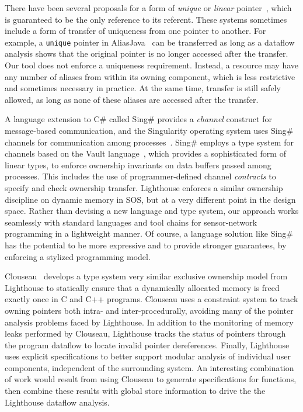 There have been several proposals for a form of {\em unique} or {\em linear}
pointer~\cite{Boyland:2001:ABU,aliasjava,Wad90:linear}, which is guaranteed
to be the only reference to its referent.  
%
These systems sometimes include a form of transfer of uniqueness from one
pointer to another.
%
For example, a {\tt unique} pointer in AliasJava~\cite{aliasjava} can be
transferred as long as a dataflow analysis shows that the original pointer
is no longer accessed after the transfer.  
%
Our tool does not enforce a uniqueness requirement.
%
Instead, a resource may have any number of aliases from within its owning
component, which is less restrictive and sometimes necessary in practice.
%
%  
At the same time, transfer is still safely allowed, as long as none of these
aliases are accessed after the transfer.



A language extension to C\# called Sing\# provides a {\em channel} construct
for message-based communication, and the Singularity operating system uses
Sing\# channels for communication among
processes~\cite{fahndrich06language}.  
%
Sing\# employs a type system for channels based on the Vault
language~\cite{Vault,adoption-focus}, which provides a sophisticated form of
linear types, to enforce ownership invariants on data buffers passed among
processes.  
%
This includes the use of programmer-defined channel {\em contracts} to
specify and check ownership transfer.
%
Lighthouse enforces a similar ownership discipline on dynamic memory in SOS,
but at a very different point in the design space.  
%
Rather than devising a new language and type system, our approach works
seamlessly with standard languages and tool chains for sensor-network
programming in a lightweight manner.  
%
Of course, a language solution like Sing\# has the potential to be more
expressive and to provide stronger guarantees, by enforcing a stylized
programming model.



%
Clouseau~\cite{heine03pldi} develops a type system very similar exclusive
ownership model from Lighthouse to statically ensure that a dynamically
allocated memory is freed exactly once in C and C++ programs.
%
Clouseau uses a constraint system to track owning pointers both intra- and
inter-procedurally, avoiding many of the pointer analysis problems faced by
Lighthouse.
%
In addition to the monitoring of memory leaks performed by Clouseau,
Lighthouse tracks the status of pointers through the program dataflow to
locate invalid pointer dereferences.
%
Finally, Lighthouse uses explicit specifications to better support modular
analysis of individual user components, independent of the surrounding
system.
%
An interesting combination of work would result from using Clouseau to
generate specifications for functions, then combine these results with
global store information to drive the the Lighthouse dataflow analysis.


